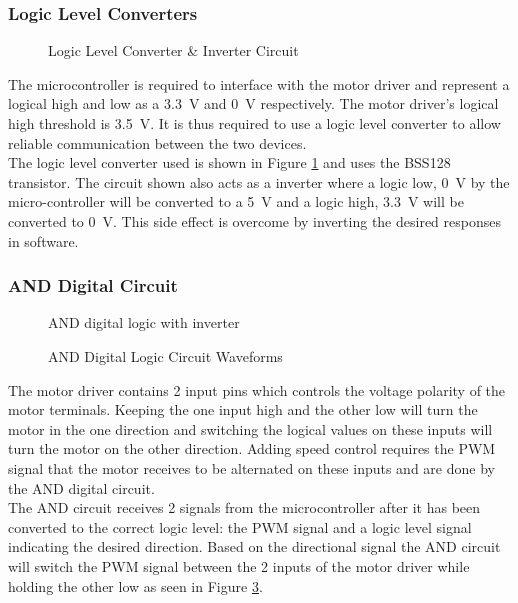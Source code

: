 \subsubsection{Logic Level Converters}
\begin{figure}[h]
	\centering
	
	\caption{Logic Level Converter \& Inverter Circuit}
	\label{fig:interterCirc}
\end{figure}


The microcontroller is required to interface with the motor driver and represent a logical high and low as a \SI{3.3}{V} and \SI{0}{V} respectively. The motor driver's logical high threshold is \SI{3.5}{V}. It is thus required to use a logic level converter to allow reliable communication between the two devices.\\

The logic level converter used is shown in Figure \ref{fig:interterCirc} and uses the BSS128 transistor. The circuit shown also acts as a inverter where a logic low, \SI{0}{V} by the micro-controller will be converted to a \SI{5}{V} and a logic high, \SI{3.3}{V} will be converted to \SI{0}{V}. This side effect is overcome by inverting the desired responses in software.


\subsubsection{AND Digital Circuit}
\begin{figure}[h]
	\centering
	
	\caption{AND digital logic with inverter}
	\label{fig:andCircuit}
\end{figure}

\begin{figure}[h]
	\centering
	
	\caption{AND Digital Logic Circuit Waveforms}
	\label{fig:andCircuit_waveform}
\end{figure}

The motor driver contains 2 input pins which controls the voltage polarity of the motor terminals. Keeping the one input high and the other low will turn the motor in the one direction and switching the logical values on these inputs will turn the motor on the other direction. Adding speed control requires the PWM signal that the motor receives to be alternated on these inputs and are done by the AND digital circuit.\\

The AND circuit receives 2 signals from the microcontroller  after it has been converted to the correct logic level: the PWM signal and a logic level signal indicating the desired direction. Based on the directional signal the AND circuit will switch the PWM signal between the 2 inputs of the motor driver while holding the other low as seen in Figure \ref{fig:andCircuit_waveform}.\\

